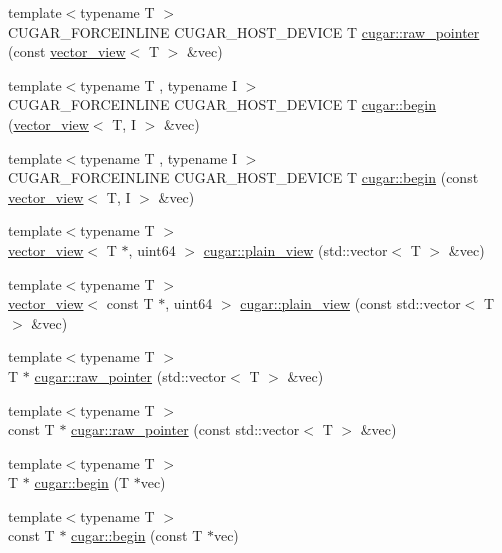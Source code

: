 \begin{DoxyCompactItemize}
\item 
{\footnotesize template$<$typename T $>$ }\\C\+U\+G\+A\+R\+\_\+\+F\+O\+R\+C\+E\+I\+N\+L\+I\+NE C\+U\+G\+A\+R\+\_\+\+H\+O\+S\+T\+\_\+\+D\+E\+V\+I\+CE T \hyperlink{group___basic_ga80c5252686ff423600f5479705b013b2}{cugar\+::raw\+\_\+pointer} (const \hyperlink{structcugar_1_1vector__view}{vector\+\_\+view}$<$ T $>$ \&vec)
\item 
{\footnotesize template$<$typename T , typename I $>$ }\\C\+U\+G\+A\+R\+\_\+\+F\+O\+R\+C\+E\+I\+N\+L\+I\+NE C\+U\+G\+A\+R\+\_\+\+H\+O\+S\+T\+\_\+\+D\+E\+V\+I\+CE T \hyperlink{group___basic_ga7a37aba0ec0ff22738563bca83609dca}{cugar\+::begin} (\hyperlink{structcugar_1_1vector__view}{vector\+\_\+view}$<$ T, I $>$ \&vec)
\item 
{\footnotesize template$<$typename T , typename I $>$ }\\C\+U\+G\+A\+R\+\_\+\+F\+O\+R\+C\+E\+I\+N\+L\+I\+NE C\+U\+G\+A\+R\+\_\+\+H\+O\+S\+T\+\_\+\+D\+E\+V\+I\+CE T \hyperlink{group___basic_gaa17977f6372733018b655cafd4a73fea}{cugar\+::begin} (const \hyperlink{structcugar_1_1vector__view}{vector\+\_\+view}$<$ T, I $>$ \&vec)
\item 
{\footnotesize template$<$typename T $>$ }\\\hyperlink{structcugar_1_1vector__view}{vector\+\_\+view}$<$ T $\ast$, uint64 $>$ \hyperlink{group___basic_ga6eb01f34e803fa6b384bf9930f6db426}{cugar\+::plain\+\_\+view} (std\+::vector$<$ T $>$ \&vec)
\item 
{\footnotesize template$<$typename T $>$ }\\\hyperlink{structcugar_1_1vector__view}{vector\+\_\+view}$<$ const T $\ast$, uint64 $>$ \hyperlink{group___basic_ga8e4563c0ae2373469c759169bd76d845}{cugar\+::plain\+\_\+view} (const std\+::vector$<$ T $>$ \&vec)
\item 
{\footnotesize template$<$typename T $>$ }\\T $\ast$ \hyperlink{group___basic_gaeb625b52748ed0238c5734163b1b0c67}{cugar\+::raw\+\_\+pointer} (std\+::vector$<$ T $>$ \&vec)
\item 
{\footnotesize template$<$typename T $>$ }\\const T $\ast$ \hyperlink{group___basic_ga97bff3b3a7f7278e5c0430158abdd4af}{cugar\+::raw\+\_\+pointer} (const std\+::vector$<$ T $>$ \&vec)
\item 
{\footnotesize template$<$typename T $>$ }\\T $\ast$ \hyperlink{group___basic_ga26acbb08b64652358a9b55c16f4f9f97}{cugar\+::begin} (T $\ast$vec)
\item 
{\footnotesize template$<$typename T $>$ }\\const T $\ast$ \hyperlink{group___basic_gab258fa2242425e638b3014c9ce667ed5}{cugar\+::begin} (const T $\ast$vec)
\end{DoxyCompactItemize}
